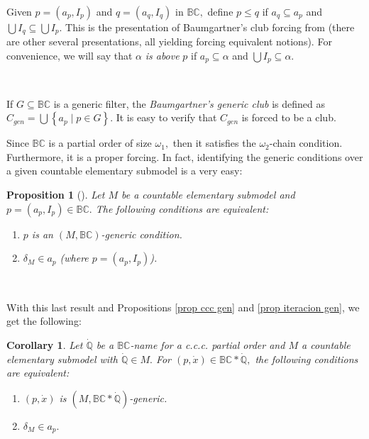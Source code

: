 \documentclass{article}
\newtheorem{corollary}[theorem]{Corollary}
\newtheorem{proposition}[theorem]{Proposition}
\begin{document}
\qquad\qquad\qquad\ \ \ 

Given $p=\left(  a_{p},I_{p}\right)  $ and $q=\left(  a_{q},I_{q}\right)  $ in
$\mathbb{BC},$ define $p\leq q$ if $a_{q}\subseteq a_{p}$ and $\bigcup
I_{q}\subseteq\bigcup I_{p}.$ This is the presentation of Baumgartner's club
forcing from \cite{CharacterizationofClubForcing} (there are other several
presentations, all yielding forcing equivalent notions). For convenience, we
will say that $\alpha$ \emph{is above }$p$ if $a_{p}\subseteq\alpha$ and
$\bigcup I_{p}\subseteq\alpha.$

\qquad\ \qquad\ \ \ \ 

If $G\subseteq\mathbb{BC}$ is a generic filter, the \emph{Baumgartner's
generic club }is defined as $C_{gen}=\bigcup\left\{  a_{p}\mid p\in G\right\}
.$ It is easy to verify that $C_{gen}$ is forced to be a club.

\qquad\qquad\qquad\qquad

Since $\mathbb{BC}$ is a partial order of size $\omega_{1},$ then it satisfies
the $\omega_{2}$-chain condition.\textsf{ }Furthermore, it is a proper
forcing. In fact, identifying the generic conditions over a given countable
elementary submodel is a very easy:

\begin{proposition}
[\cite{ApplicationsofPFA}]Let $M$ be a countable elementary submodel and
$p=\left(  a_{p},I_{p}\right)  \in\mathbb{BC}.$ The following conditions are
equivalent: \label{Prop BC proper}

\begin{enumerate}
\item $p$ is an $(M,\mathbb{BC})$-generic condition.

\item $\delta_{M}\in a_{p}$ (where $p=\left(  a_{p},I_{p}\right)  $).
\end{enumerate}
\end{proposition}

\qquad\ \ \ \ \ \ 

With this last result and Propositions \ref{prop ccc gen} and
\ref{prop iteracion gen}, we get the following:

\begin{corollary}
Let $\mathbb{\dot{Q}}$ be a $\mathbb{BC}$-name for a \textsf{c.c.c.} partial
order and $M$ a countable elementary submodel with $\mathbb{\dot{Q}}\in M.$
For $(p,\dot{x})\in\mathbb{BC}\ast\mathbb{\dot{Q}},$ the following conditions
are equivalent: \label{Cor BC 2 pasos}

\begin{enumerate}
\item $(p,\dot{x})$ is $(M,\mathbb{BC}\ast\mathbb{\dot{Q}})$-generic.

\item $\delta_{M}\in a_{p}.$\qquad
\end{enumerate}
\end{corollary}
\end{document}
